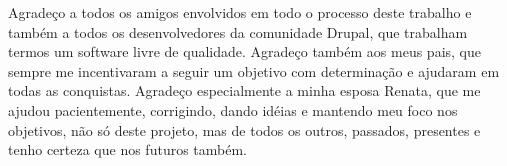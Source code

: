 
Agradeço a todos os amigos envolvidos em todo o processo deste trabalho e também a todos os desenvolvedores da comunidade Drupal, que trabalham termos um software livre de qualidade. Agradeço também aos meus pais, que sempre me incentivaram a seguir um objetivo com determinação e ajudaram em todas as conquistas. Agradeço especialmente a minha esposa Renata, que me ajudou pacientemente, corrigindo, dando idéias e mantendo meu foco nos objetivos, não só deste projeto, mas de todos os outros, passados, presentes e tenho certeza que nos futuros também.
